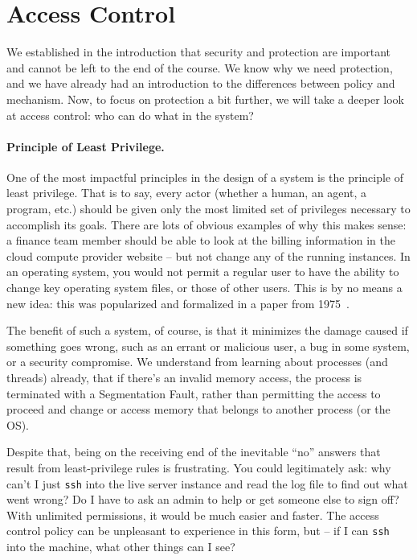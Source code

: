 




\section*{Access Control}

We established in the introduction that security and protection are important and cannot be left to the end of the course. We know why we need protection, and we have already had an introduction to the differences between policy and mechanism. Now, to focus on protection a bit further, we will take a deeper look at access control: who can do what in the system?

\paragraph{Principle of Least Privilege.} One of the most impactful principles in the design of a system is the principle of least privilege. That is to say, every actor (whether a human, an agent, a program, etc.) should be given only the most limited set of privileges necessary to accomplish its goals. There are lots of obvious examples of why this makes sense: a finance team member should be able to look at the billing information in the cloud compute provider website -- but not change any of the running instances. In an operating system, you would not permit a regular user to have the ability to change key operating system files, or those of other users. This is by no means a new idea: this was popularized and formalized in a paper from 1975~\cite{1451869}.

The benefit of such a system, of course, is that it minimizes the damage caused if something goes wrong, such as an errant or malicious user, a bug in some system, or a security compromise. We understand from learning about processes (and threads) already, that if there's an invalid memory access, the process is terminated with a Segmentation Fault, rather than permitting the access to proceed and change or access memory that belongs to another process (or the OS).

Despite that, being on the receiving end of the inevitable ``no'' answers that result from least-privilege rules is frustrating. You could legitimately ask: why can't I just \texttt{ssh} into the live server instance and read the log file to find out what went wrong? Do I have to ask an admin to help or get someone else to sign off? With unlimited permissions, it would be much easier and faster. The access control policy can be unpleasant to experience in this form, but -- if I can \texttt{ssh} into the machine, what other things can I see?

